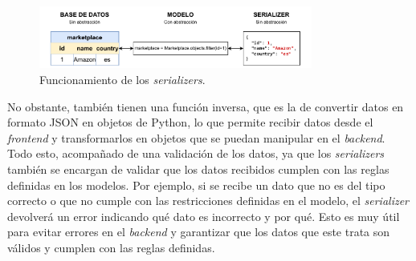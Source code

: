 \begin{figure}
    \centering
    \includegraphics[width=0.8\textwidth]{figures/design_develop/serializers.pdf}
    \caption{Funcionamiento de los \textit{serializers}.}
    \label{dev:fig:serializer}
\end{figure}

No obstante, también tienen una función inversa, que es la de convertir datos en formato JSON en objetos de Python, lo que permite recibir datos desde el \textit{frontend} y transformarlos en objetos que se puedan manipular en el \textit{backend}. Todo esto, acompañado de una validación de los datos, ya que los \textit{serializers} también se encargan de validar que los datos recibidos cumplen con las reglas definidas en los modelos. Por ejemplo, si se recibe un dato que no es del tipo correcto o que no cumple con las restricciones definidas en el modelo, el \textit{serializer} devolverá un error indicando qué dato es incorrecto y por qué. Esto es muy útil para evitar errores en el \textit{backend} y garantizar que los datos que este trata son válidos y cumplen con las reglas definidas.

